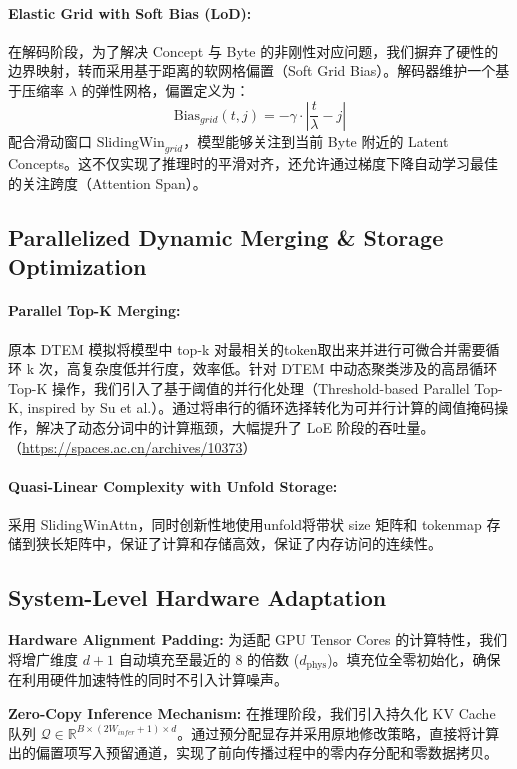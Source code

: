 \documentclass[a4paper,11pt]{ctexart}
\begin{document}
\paragraph{Elastic Grid with Soft Bias (LoD):}
在解码阶段，为了解决 Concept 与 Byte 的非刚性对应问题，我们摒弃了硬性的边界映射，转而采用基于距离的软网格偏置（Soft Grid Bias）。解码器维护一个基于压缩率 $\lambda$ 的弹性网格，偏置定义为：
\begin{equation}
  \text{Bias}_{grid}(t, j) = - \gamma \cdot \left| \frac{t}{\lambda} - j \right|
\end{equation}
配合滑动窗口 $\text{SlidingWin}_{grid}$，模型能够关注到当前 Byte 附近的 Latent Concepts。这不仅实现了推理时的平滑对齐，还允许通过梯度下降自动学习最佳的关注跨度（Attention Span）。

\subsection{Parallelized Dynamic Merging \& Storage Optimization}
\paragraph{Parallel Top-K Merging:}
原本 DTEM 模拟将模型中 top-k 对最相关的token取出来并进行可微合并需要循环 k 次，高复杂度低并行度，效率低。针对 DTEM 中动态聚类涉及的高昂循环 Top-K 操作，我们引入了基于阈值的并行化处理（Threshold-based Parallel Top-K, inspired by Su et al.）。通过将串行的循环选择转化为可并行计算的阈值掩码操作，解决了动态分词中的计算瓶颈，大幅提升了 LoE 阶段的吞吐量。（\url{https://spaces.ac.cn/archives/10373}）

\paragraph{Quasi-Linear Complexity with Unfold Storage:}
采用 SlidingWinAttn，同时创新性地使用unfold将带状 size 矩阵和 tokenmap 存储到狭长矩阵中，保证了计算和存储高效，保证了内存访问的连续性。

\subsection{System-Level Hardware Adaptation}
\textbf{Hardware Alignment Padding:} 为适配 GPU Tensor Cores 的计算特性，我们将增广维度 $d+1$ 自动填充至最近的 8 的倍数 ($d_{\text{phys}}$)。填充位全零初始化，确保在利用硬件加速特性的同时不引入计算噪声。

\textbf{Zero-Copy Inference Mechanism:} 在推理阶段，我们引入持久化 KV Cache 队列 $\mathcal{Q} \in \mathbb{R}^{B \times (2W_{infer}+1) \times d}$。通过预分配显存并采用原地修改策略，直接将计算出的偏置项写入预留通道，实现了前向传播过程中的零内存分配和零数据拷贝。
\end{document}
